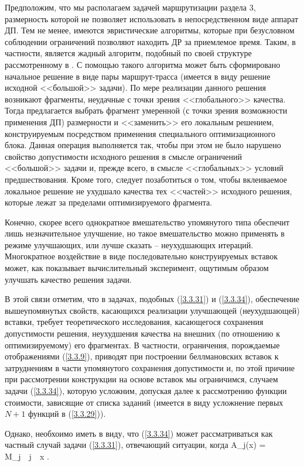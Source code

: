 Предположим, что мы располагаем задачей маршрутизации раздела 3,
размерность
которой не позволяет использовать в непосредственном виде аппарат ДП.
Тем не
менее, имеются эвристические  алгоритмы, которые
при безусловном соблюдении ограничений
позволяют находить ДР за приемлемое время.
Таким, в частности,
является жадный алгоритм, подобный по своей структуре рассмотренному в
\cite{Cha8`}.
С помощью такого алгоритма может быть сформировано начальное
решение в виде пары маршрут-трасса
(имеется в виду решение исходной <<большой>> задачи).
По мере реализации данного решения возникают фрагменты,
неудачные с
точки зрения <<глобального>> качества.
Тогда предлагается выбрать фрагмент
умеренной
(с точки зрения возможности применения ДП)
размерности и <<заменить>>
его локальным решением, конструируемым посредством применения специального
оптимизационного блока.
Данная операция выполняется так,
чтобы при этом не было
нарушено свойство допустимости исходного решения
в смысле ограничений <<большой>>
задачи и, прежде всего, в смысле <<глобальных>> условий предшествования.
Кроме
того, следует позаботиться о том, чтобы вклеиваемое локальное решение не ухудшало
качества тех <<частей>> исходного решения,
которые лежат за пределами оптимизируемого фрагмента.

Конечно, скорее всего однократное вмешательство упомянутого типа обеспечит лишь
незначительное улучшение,
но такое вмешательство можно применять в режиме улучшающих,
или лучше сказать -- неухудшающих итераций.
Многократное воздействие в
виде последовательно конструируемых вставок может,
как показывает вычислительный эксперимент,
ощутимым образом
улучшать качество решения задачи.

В этой связи отметим, что в задачах,
подобных (\ref{3.3.31}) и (\ref{3.3.34}),
обеспечение вышеупомянутых свойств,
касающихся реализации улучшающей (неухудшающей)
вставки, требует теоретического исследования,
касающегося сохранения допустимости
решения, неухудшения качества на внешних
(по отношению к оптимизируемому)
его фрагментах.
В частности, ограничения, порождаемые отображениями (\ref{3.3.9}),
приводят при построении беллмановских вставок
к затруднениям в части упомянутого
сохранения допустимости и, по этой причине
при рассмотрении
конструкции на основе вставок
мы ограничимся,
случаем задачи (\ref{3.3.34}),
которую
усложним, допуская далее к рассмотрению функции стоимости,
зависящие от списка заданий
(имеется в виду усложнение первых $N+1$ функций в (\ref{3.3.29})).

Однако, необхоимо иметь в виду,
что (\ref{3.3.34}) может рассматриваться как частный
случай задачи (\ref{3.3.31}),
отвечающий ситуации, когда
\bfn
  \label{3.6.1}
  A_j(x) = M_j\ \ \fa j\in {}\ \ \fa x\in {}
  .
\efn

